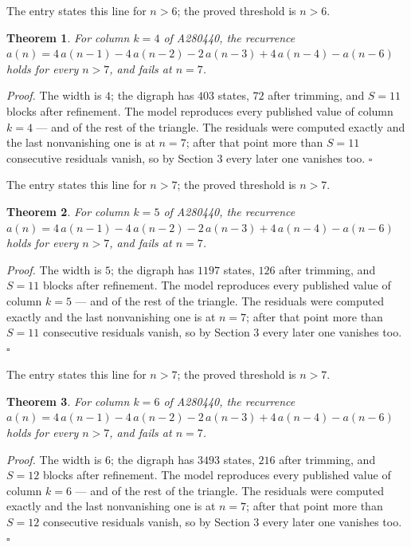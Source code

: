 \documentclass[11pt]{article}
\newtheorem{theorem}{Theorem}
\theoremstyle{definition}
\begin{document}
The entry states this line for $n > 6$; the proved threshold is $n > 6$.

\begin{theorem} For column $k = 4$ of A280440, the recurrence $a(n) = 4\,a(n-1) - 4\,a(n-2) - 2\,a(n-3) + 4\,a(n-4) - a(n-6)$ holds for every $n > 7$, and fails at $n = 7$.\end{theorem}

{\itshape Proof.} The width is $4$; the digraph has $403$ states, $72$ after trimming, and $S = 11$ blocks after refinement. The model reproduces every published value of column $k = 4$ --- and of the rest of the triangle. The residuals were computed exactly and the last nonvanishing one is at $n = 7$; after that point more than $S = 11$ consecutive residuals vanish, so by Section 3 every later one vanishes too. $\square$

The entry states this line for $n > 7$; the proved threshold is $n > 7$.

\begin{theorem} For column $k = 5$ of A280440, the recurrence $a(n) = 4\,a(n-1) - 4\,a(n-2) - 2\,a(n-3) + 4\,a(n-4) - a(n-6)$ holds for every $n > 7$, and fails at $n = 7$.\end{theorem}

{\itshape Proof.} The width is $5$; the digraph has $1197$ states, $126$ after trimming, and $S = 11$ blocks after refinement. The model reproduces every published value of column $k = 5$ --- and of the rest of the triangle. The residuals were computed exactly and the last nonvanishing one is at $n = 7$; after that point more than $S = 11$ consecutive residuals vanish, so by Section 3 every later one vanishes too. $\square$

The entry states this line for $n > 7$; the proved threshold is $n > 7$.

\begin{theorem} For column $k = 6$ of A280440, the recurrence $a(n) = 4\,a(n-1) - 4\,a(n-2) - 2\,a(n-3) + 4\,a(n-4) - a(n-6)$ holds for every $n > 7$, and fails at $n = 7$.\end{theorem}

{\itshape Proof.} The width is $6$; the digraph has $3493$ states, $216$ after trimming, and $S = 12$ blocks after refinement. The model reproduces every published value of column $k = 6$ --- and of the rest of the triangle. The residuals were computed exactly and the last nonvanishing one is at $n = 7$; after that point more than $S = 12$ consecutive residuals vanish, so by Section 3 every later one vanishes too. $\square$
\end{document}
